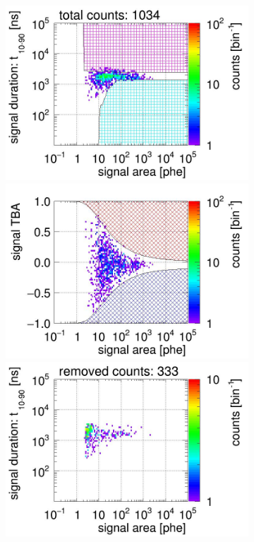 \begin{landscape}
	\begin{figure}[!p]\ContinuedFloat
	\centering
	\begin{subfigure}[t]{0.32\textwidth}
		\centering
		\includegraphics[width=\figurewidth,clip,trim={0 98 0 15}]{Figures/GasTest/CutsValid/res64767/pdpa15Vecfig64767.jpg}
		\includegraphics[width=\figurewidth,clip,trim={0 98 0 40}]{Figures/GasTest/CutsValid/res64767/tbapa15Vecfig64767.jpg}
		\includegraphics[width=\figurewidth,clip,trim={0 98 0 15}]{Figures/GasTest/CutsValid/res64767/pdpaX15Vecfig64767.jpg}

\end{subfigure}
\end{figure}
\end{landscape}
